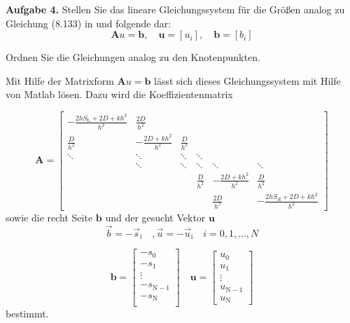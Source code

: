\begin{mybox}
	\textbf{Aufgabe 4.} Stellen Sie das lineare Gleichungssystem für die
	Größen analog zu Gleichung (8.133) in \cite{Atkinson.2004} und folgende dar:
	\begin{equation}\label{eq:lgs}
		\mathbf{A} u = \mathbf{b},\quad \mathbf{u} = [u_i],\quad
		\mathbf{b} = [b_i]
	\end{equation}

	Ordnen Sie die Gleichungen analog zu den Knotenpunkten.
\end{mybox}

Mit Hilfe der Matrixform $\mathbf{A} u =\mathbf{ b} $ lässt sich dieses
Gleichungssystem mit Hilfe von Matlab lösen. Dazu wird die Koeffizientenmatrix

\begin{equation}
	\mathbf{A}=	\begin{bmatrix}
		-\frac{2hS_\mathrm{L}+2D+kh^2}{h^2} & \frac{2D}{h^2}        &               &               &                       &
		\\
		\frac{D}{h^2}                       & - \frac{2D+kh^2}{h^2} & \frac{D}{h^2} &               &                       &
		\\
		\ddots                              & \ddots                & \ddots        & \ddots        &                       &                            \\
		                                    & \ddots                & \ddots        & \ddots        & \ddots                & \ddots                     \\
		                                    &                       &               & \frac{D}{h^2} & - \frac{2D+kh^2}{h^2} & \frac{D}{h^2}
		\\
		                                    &                       &               &               & \frac{2D}{h^2}        & -\frac{2hS_R+2D+kh^2}{h^2}
	\end{bmatrix}
\end{equation}
sowie die recht Seite $\mathbf{b}$ und der gesucht Vektor $\mathbf{u}$
\begin{equation}
	\vec{b}=-\vec{s}_\mathrm{i}\quad,	\vec{u}=-\vec{u}_\mathrm{i}
	\quad i=0,1,\dots,N
\end{equation}

\begin{equation}
	\mathbf{b}=\begin{bmatrix}
		-	s_0              \\
		-	s_1              \\
		\vdots            \\
		-	s_{\mathrm{N}-1} \\
		-	s_{\mathrm{N}}   \\
	\end{bmatrix} \quad \mathbf{u}=\begin{bmatrix}
		u_0              \\
		u_1              \\
		\vdots           \\
		u_{\mathrm{N}-1} \\
		u_\mathrm{N}
	\end{bmatrix}
\end{equation}
bestimmt.

